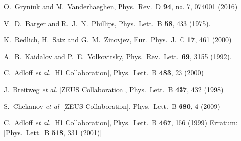 \documentclass[10pt,prd,aps,nofootinbib,superscriptaddress]{revtex4}
\begin{document}
\begin{thebibliography}{99}

  O.~Gryniuk and M.~Vanderhaeghen,
  Phys.\ Rev.\ D {\bf 94}, no. 7, 074001 (2016)

  V.~D.~Barger and R.~J.~N.~Phillips,
  Phys.\ Lett.\ B {\bf 58}, 433 (1975).
  

  K.~Redlich, H.~Satz and G.~M.~Zinovjev,
  Eur.\ Phys.\ J.\ C {\bf 17}, 461 (2000)

  A.~B.~Kaidalov and P.~E.~Volkovitsky,
  Phys.\ Rev.\ Lett.\  {\bf 69}, 3155 (1992).
 
 
  C.~Adloff {\it et al.} [H1 Collaboration],
  Phys.\ Lett.\ B {\bf 483}, 23 (2000)


  J.~Breitweg {\it et al.} [ZEUS Collaboration],
  Phys.\ Lett.\ B {\bf 437}, 432 (1998)
 

  S.~Chekanov {\it et al.} [ZEUS Collaboration],
  Phys.\ Lett.\ B {\bf 680}, 4 (2009)
 

  C.~Adloff {\it et al.} [H1 Collaboration],
  Phys.\ Lett.\ B {\bf 467}, 156 (1999)
  Erratum: [Phys.\ Lett.\ B {\bf 518}, 331 (2001)]
 


\end{thebibliography}
\end{document}
